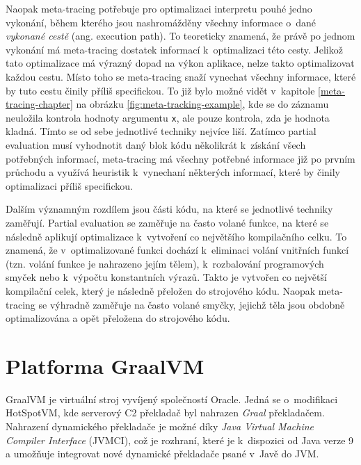 \documentclass[
  master,
  biblatex,
  figures=true,
  theorems,
  sourcecodes,
  glossaries,
  index
]{kidiplom}
\begin{document}
Naopak meta-tracing potřebuje pro optimalizaci interpretu pouhé jedno vykonání, během kterého jsou nashromážděny všechny informace o~dané \textit{vykonané cestě} (ang. execution path). To teoreticky znamená, že právě po jednom vykonání má meta-tracing dostatek informací k~optimalizaci této cesty. Jelikož tato optimalizace má výrazný dopad na výkon aplikace, nelze takto optimalizovat každou cestu. Místo toho se meta-tracing snaží vynechat všechny informace, které by tuto cestu činily příliš specifickou. To již bylo možné vidět v~kapitole \ref{meta-tracing-chapter} na obrázku \ref{fig:meta-tracking-example}, kde se do záznamu neuložila kontrola hodnoty argumentu \texttt{x}, ale pouze kontrola, zda je hodnota kladná. Tímto se od sebe jednotlivé techniky nejvíce liší. Zatímco partial evaluation musí vyhodnotit daný blok kódu několikrát k~získání všech potřebných informací, meta-tracing má všechny potřebné informace již po prvním průchodu a využívá heuristik k~vynechaní některých informací, které by činily optimalizaci příliš specifickou. 

Dalším významným rozdílem jsou části kódu, na které se jednotlivé techniky zaměřují. Partial evaluation se zaměřuje na často volané funkce, na které se následně aplikují optimalizace k~vytvoření co největšího kompilačního celku. To znamená, že v~optimalizované funkci dochází k~eliminaci volání vnitřních funkcí (tzn. volání funkce je nahrazeno jejím tělem), k~rozbalování programových smyček nebo k~výpočtu konstantních výrazů. Takto je vytvořen co největší kompilační celek, který je následně přeložen do strojového kódu. Naopak meta-tracing se výhradně zaměřuje na často volané smyčky, jejichž těla jsou obdobně optimalizována a opět přeložena do strojového kódu.   


\newpage


\section{Platforma GraalVM}
GraalVM je virtuální stroj vyvíjený společností Oracle. Jedná se o~modifikaci HotSpotVM, kde serverový C2 překladač byl nahrazen \textit{Graal} překladačem. Nahrazení dynamického překladače je možné díky \textit{Java Virtual Machine Compiler Interface} (JVMCI), což je rozhraní, které je k~dispozici od Java verze 9 a umožňuje integrovat nové dynamické překladače psané v~Javě do JVM. 
\end{document}
